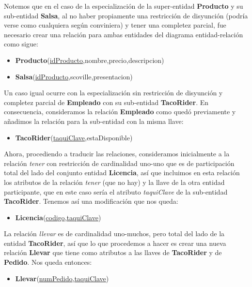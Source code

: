 \documentclass[11pt,letterpaper]{article}
\begin{document}
Notemos que en el caso de la especialización de la super-entidad \textbf{Producto} y su sub-entidad \textbf{Salsa}, al no haber propiamente una restricción de disyunción (podría verse como cualquiera según conviniera) y tener una completez parcial, fue necesario crear una relación para ambas entidades del diagrama entidad-relación como sigue:

\begin{itemize}
\item \footnotesize{\textbf{Producto}(\underline{idProducto},nombre,precio,descripcion)}
\item \footnotesize{\textbf{Salsa}(\underline{idProducto},scoville,presentacion)}
\end{itemize}

Un caso igual ocurre con la especialización sin restricción de disyunción y completez parcial de \textbf{Empleado} con su sub-entidad \textbf{TacoRider}. En consecuencia, consideramos la relación \textbf{Empleado} como quedó previamente y añadimos la relación para la sub-entidad con la misma llave:

\begin{itemize}
\item \footnotesize{\textbf{TacoRider}(\underline{taquiClave},estaDisponible)}
\end{itemize}

Ahora, procediendo a traducir las relaciones, consideramos inicialmente a la relación \textit{tener} con restricción de cardinalidad uno-uno que es de participación total del lado del conjunto entidad \textbf{Licencia}, así que incluimos en esta relación los atributos de la relación \textit{tener} (que no hay) y la llave de la otra entidad participante, que en este caso sería el atributo \textit{taquiClave} de la sub-entidad \textbf{TacoRider}. Tenemos así una modificación que nos queda:

\begin{itemize}
\item \footnotesize{\textbf{Licencia}(\underline{codigo},\underline{taquiClave}})
\end{itemize}

La relación \textit{llevar} es de cardinalidad uno-muchos, pero total del lado de la entidad \textbf{TacoRider}, así que lo que  procedemos a hacer es crear una nueva relación \textbf{Llevar} que tiene como atributos a las llaves de \textbf{TacoRider} y de \textbf{Pedido}. Nos queda entonces:



\begin{itemize}
\item \footnotesize{\textbf{Llevar}(\underline{numPedido},\underline{taquiClave})}
\end{itemize}
\end{document}
